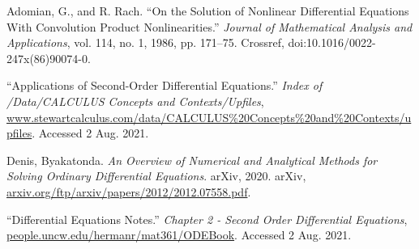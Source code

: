 \begin{thebibliography}{12}


Adomian, G., and R. Rach. “On the Solution of Nonlinear Differential Equations With Convolution Product Nonlinearities.” \emph{Journal of Mathematical Analysis and Applications}, vol. 114, no. 1, 1986, pp. 171–75. Crossref, doi:10.1016/0022-247x(86)90074-0.


“Applications of Second-Order Differential Equations.” \emph{Index of /Data/CALCULUS Concepts and Contexts/Upfiles}, \url{www.stewartcalculus.com/data/CALCULUS\%20Concepts\%20and\%20Contexts/upfiles}. Accessed 2 Aug. 2021.



Denis, Byakatonda. \emph{An Overview of Numerical and Analytical Methods for Solving Ordinary Differential Equations}. arXiv, 2020. arXiv, \url{arxiv.org/ftp/arxiv/papers/2012/2012.07558.pdf}.

“Differential Equations Notes.” \emph{Chapter 2 - Second Order Differential Equations}, \url{people.uncw.edu/hermanr/mat361/ODEBook}. Accessed 2 Aug. 2021.





\end{thebibliography}

